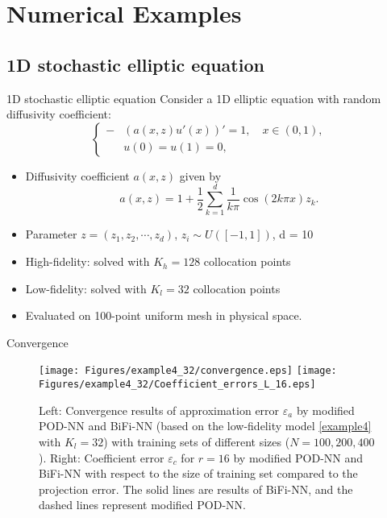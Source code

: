 \documentclass[10pt]{beamer}
\begin{document}

\section{Numerical Examples}

\subsection{1D stochastic elliptic equation}

\begin{frame}{1D stochastic elliptic equation}
Consider a 1D elliptic equation with random diffusivity coefficient:
\begin{equation}\label{example4}
\left\{ 
\begin{aligned}
-&(a(x, z)u'(x))' = 1, \quad x\in (0, 1), \\ 
&u(0) = u(1) = 0,
\end{aligned}
\right.
\end{equation}
\begin{itemize}
	\item Diffusivity coefficient $a(x, z)$ given by
		\begin{equation}
		a(x, z) = 1+\frac{1}{2}\sum_{k=1}^{d}\frac{1}{k\pi}\cos(2k\pi x)z_k.
		\end{equation}
	\item Parameter $z = (z_1, z_2, \cdots, z_d)$, $z_i\sim U([-1, 1]) $, d = 10
	\item High-fidelity: solved with $K_h=128 $ collocation points
	\item Low-fidelity: solved with $K_l=32 $ collocation points
	\item Evaluated on 100-point uniform mesh in physical space.
\end{itemize}
\end{frame}

\begin{frame}{Convergence}
\begin{figure}[htbp]
\centering
\vbox{
\texttt{[image: Figures/example4\_32/convergence.eps]}
\texttt{[image: Figures/example4\_32/Coefficient\_errors\_L\_16.eps]}
}
\caption{Left: Convergence results of approximation error $\varepsilon_a$ by modified POD-NN and BiFi-NN (based on the low-fidelity model \eqref{example4} with $K_l=32$) with training sets of different sizes ($N=100,200,400$). Right: Coefficient error $\varepsilon_c$ for $r = 16$ by modified POD-NN and BiFi-NN with respect to the size of training set compared to the projection error. The solid lines are results of BiFi-NN, and the dashed lines represent modified POD-NN.}
\label{example4-errors}
\end{figure}
\end{frame}
\end{document}
